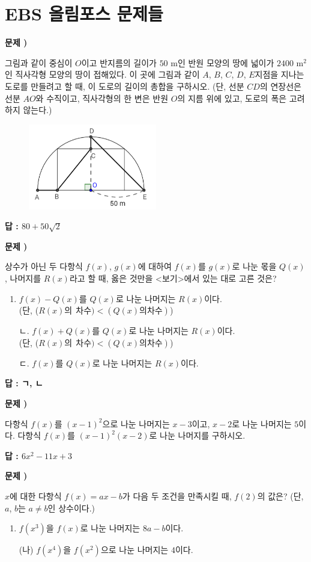 \documentclass{oblivoir}
\newcounter{num}
\newcommand\prob[1]
{\bigskip\par\noindent\stepcounter{num} \textbf{문제 \thenum) #1}\par\noindent}
\newcommand\ans[1]
{\par{\raggedleft\textbf{답 : #1}
\par}\bigskip\bigskip}
\begin{document}
\section*{EBS 올림포스 문제들}

%
\prob{}
그림과 같이 중심이 \(O\)이고 반지름의 길이가 \(50\) m인 반원 모양의 땅에 넓이가 \(2400\) m\(^2\)인 직사각형 모양의 땅이 접해있다.
이 곳에 그림과 같이 \(A\), \(B\), \(C\), \(D\), \(E\)지점을 지나는 도로를 만들려고 할 때, 이 도로의 길이의 총합을 구하시오.
(단, 선분 \(CD\)의 연장선은 선분 \(AO\)와 수직이고, 직사각형의 한 변은 반원 \(O\)의 지름 위에 있고, 도로의 폭은 고려하지 않는다.)
\begin{figure}[h!]
\centering
\includegraphics[width=0.5\textwidth]{1}
\end{figure}
\ans{\(80+50\sqrt2\)}

%
\prob{}
상수가 아닌 두 다항식 \(f(x)\), \(g(x)\)에 대하여 \(f(x)\)를 \(g(x)\)로 나눈 몫을 \(Q(x)\), 나머지를 \(R(x)\)라고 할 때, 옳은 것만을 <보기>에서 있는 대로 고른 것은?
\begin{mdframed}[frametitle=<보기>]
\begin{enumerate}[ㄱ.]
\item
\(f(x)-Q(x)\)를 \(Q(x)\)로 나눈 나머지는 \(R(x)\)이다.\\
(단, (\(R(x)의\:\:차수)<(Q(x)의 차수)\))
\item[ㄴ.]
\(f(x)+Q(x)\)를 \(Q(x)\)로 나눈 나머지는 \(R(x)\)이다.\\
(단, (\(R(x)의\:\:차수)<(Q(x)의 차수)\))
\item[ㄷ.]
\(f(x)\)를 \(Q(x)\)로 나눈 나머지는 \(R(x)\)이다.
\end{enumerate}
\end{mdframed}
\ans{ㄱ, ㄴ}


%
\prob{}
다항식 \(f(x)\)를 \((x-1)^2\)으로 나눈 나머지는 \(x-3\)이고, \(x-2\)로 나눈 나머지는 \(5\)이다.
다항식 \(f(x)\)를 \((x-1)^2(x-2)\)로 나눈 나머지를 구하시오.
\ans{\(6x^2-11x+3\)}

\newpage
%
\prob{}
\(x\)에 대한 다항식 \(f(x)=ax-b\)가 다음 두 조건을 만족시킬 때, \(f(2)\)의 값은?
(단, \(a\), \(b\)는 \(a\neq b\)인 상수이다.)
\begin{mdframed}
\begin{enumerate}[(가)]
\item
\(f(x^3)\)을 \(f(x)\)로 나눈 나머지는 \(8a-b\)이다.
\item[(나)]
\(f(x^4)\)을 \(f(x^2)\)으로 나눈 나머지는 \(4\)이다.
\end{enumerate}
\end{mdframed}
\end{document}
